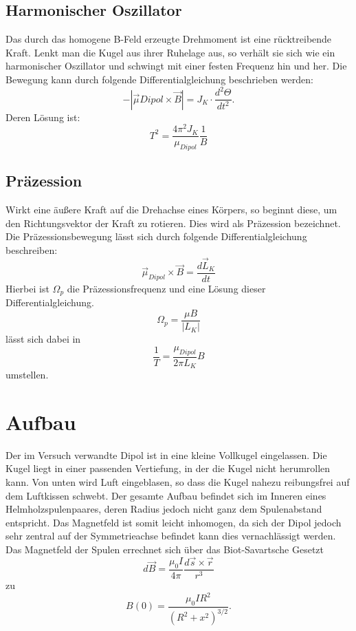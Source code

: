   \subsection{Harmonischer Oszillator}
  Das durch das homogene B-Feld erzeugte Drehmoment ist eine rücktreibende Kraft. Lenkt man die Kugel aus ihrer Ruhelage aus, so verhält sie sich wie ein harmonischer Oszillator und schwingt mit einer festen Frequenz hin und her.
Die Bewegung kann durch folgende Differentialgleichung beschrieben werden:
\begin{equation}
-|\vec{\mu}Dipol \times \vec{B}| = J_K \cdot \frac{d^2 \Theta}{dt^2}.
\end{equation}
Deren Lösung ist:
\begin{equation}
T^2=\frac{4\pi^2J_K}{\mu_{Dipol}} \frac{1}{B}
\label{oszi}
\end{equation}
  \subsection{Präzession}
 Wirkt eine äußere Kraft auf die Drehachse eines Körpers, so beginnt diese, um den Richtungsvektor der Kraft zu rotieren. Dies wird als Präzession bezeichnet.
Die Präzessionsbewegung lässt sich durch folgende Differentialgleichung beschreiben:
\begin{equation}
\vec{\mu}_{Dipol} \times \vec{B} = \frac{d \vec{L}_K}{dt}
\end{equation}
Hierbei ist $\Omega_p$ die Präzessionsfrequenz und eine Lösung dieser Differentialgleichung.
\begin{equation}
\Omega_p = \frac{\mu B}{|L_K|}
\end{equation}
lässt sich dabei in
\begin{equation}
\frac{1}{T} = \frac{\mu_{Dipol}}{2 \pi L_K} B
\label{prae}
\end{equation}
umstellen.
\section{Aufbau}
Der im Versuch verwandte Dipol ist in eine kleine Vollkugel eingelassen. Die Kugel liegt in einer passenden Vertiefung, in der die Kugel nicht herumrollen kann. Von unten wird Luft eingeblasen, so dass die Kugel nahezu reibungsfrei auf dem Luftkissen schwebt.
Der gesamte Aufbau befindet sich im Inneren eines Helmholzspulenpaares, deren Radius jedoch nicht ganz dem Spulenabstand entspricht. Das Magnetfeld ist somit leicht inhomogen, da sich der Dipol jedoch sehr zentral auf der Symmetrieachse befindet kann dies vernachlässigt werden.
Das Magnetfeld der Spulen errechnet sich über das Biot-Savartsche Gesetzt
\begin{equation}
d \vec{B} = \frac{\mu_0 I}{4\pi} \frac{d \vec{s} \times \vec{r}}{r^3}
\end{equation} 
zu
\begin{equation}
B(0)=\frac{\mu_0 IR^2}{(R^2+x^2)^{3/2}}.
\end{equation}

